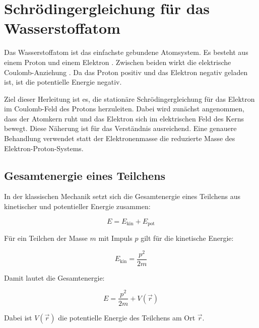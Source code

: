 \section{Schrödingergleichung für das Wasserstoffatom}
\label{app:mathe_schroedingergleichung}

Das Wasserstoffatom ist das einfachste gebundene
Atomsystem. Es besteht aus einem Proton und einem Elektron
. Zwischen beiden wirkt die elektrische Coulomb-Anziehung
. Da das Proton positiv und das Elektron negativ
geladen ist, ist die potentielle Energie negativ.

Ziel dieser Herleitung ist es, die stationäre Schrödingergleichung
 für das Elektron im Coulomb-Feld des
Protons herzuleiten. Dabei wird zunächst angenommen, dass der Atomkern ruht und
das Elektron sich im elektrischen Feld des Kerns bewegt. Diese Näherung ist für
das Verständnis ausreichend. Eine genauere Behandlung verwendet statt der
Elektronenmasse die reduzierte Masse des Elektron-Proton-Systems.

\subsection*{Gesamtenergie eines Teilchens}

In der klassischen Mechanik setzt sich die Gesamtenergie eines Teilchens aus
kinetischer und potentieller Energie zusammen:

\begin{equation}
	E = E_\mathrm{kin} + E_\mathrm{pot}
	\label{eq:app_gesamtenergie_klassisch}
\end{equation}

Für ein Teilchen der Masse \(m\) mit Impuls \(p\) gilt für die kinetische
Energie:

\begin{equation}
	E_\mathrm{kin} = \frac{p^2}{2m}
	\label{eq:app_kinetische_energie_impuls}
\end{equation}

Damit lautet die Gesamtenergie:

\begin{equation}
	E = \frac{p^2}{2m} + V(\vec r)
	\label{eq:app_gesamtenergie_potential}
\end{equation}

Dabei ist \(V(\vec r)\) die potentielle Energie des Teilchens
am Ort \(\vec r\).

